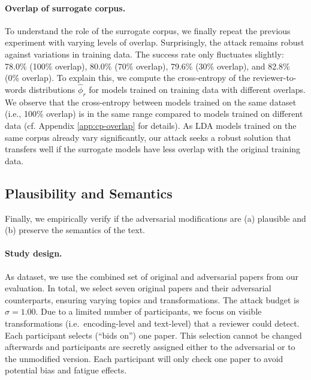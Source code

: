 \documentclass[letterpaper,twocolumn,10pt]{article}
\newcommand{\reviewer}{r}
\newcommand{\reviewerwords}{\hat{\topicworddist}}
\newcommand{\topicworddist}{\phi}
\newcommand{\attackbudgetscale}{\sigma}
\begin{document}
\paragraph{Overlap of surrogate corpus.}
To understand the role of the surrogate corpus, we finally repeat the previous experiment with varying levels of overlap.
Surprisingly, the attack remains robust against variations in training data. The success rate only fluctuates slightly: 78.0\% (100\% overlap), 80.0\% (70\% overlap), 79.6\% (30\% overlap), and 82.8\% (0\% overlap).
To explain this, we compute the cross-entropy of the reviewer-to-words distributions $\reviewerwords_\reviewer$ for models trained on training data with different overlaps. We observe that the cross-entropy between models trained on the same dataset (i.e., 100\% overlap) is in the same range compared to models trained on different data (cf. Appendix \ref{app:cp-overlap} for details).
As LDA models trained on the same corpus already vary significantly, our attack seeks a robust solution that transfers well if the surrogate models have less overlap with the original training data.

\subsection{Plausibility and Semantics}
\label{sec:user-study}
Finally, we empirically verify if the adversarial modifications are (a) plausible and (b) preserve the semantics of the text. 

\paragraph{Study design.}
As dataset, we use the combined set of original and adversarial papers from our evaluation.
In total, we select seven original papers and their adversarial counterparts, ensuring varying topics and transformations. The attack budget is $\attackbudgetscale = 1.00$. 
Due to a limited number of participants, we focus on visible transformations (i.e.\ encoding-level and text-level) that a reviewer could detect.
Each participant selects (``bids on'') one paper. This selection cannot be changed afterwards and participants are secretly assigned either to the adversarial or to the unmodified version. Each participant will only check one paper to avoid potential bias and fatigue effects.
\end{document}
